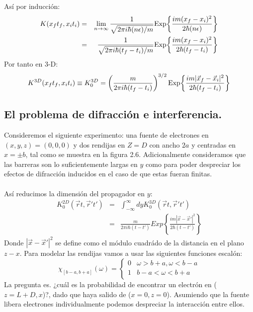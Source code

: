 Así por inducción:
\begin{eqnarray}
\nonumber K(x_{f}t_{f},x_{i}t_{i})&=&\lim_{n\to\infty}\frac{1}{\sqrt{2\pi i\hbar(n\epsilon)/m}}\text{Exp\ensuremath{\left\{ \frac{im(x_{f}-x_{i})^{2}}{2\hbar(n\epsilon)}\right\} }}\\
&=& \frac{1}{\sqrt{2\pi i\hbar(t_{f}-t_{i})/m}}\text{Exp\ensuremath{\left\{ \frac{im(x_{f}-x_{i})^{2}}{2\hbar(t_{f}-t_{i})}\right\} }}
\end{eqnarray}
Por tanto en 3-D:
\begin{equation}
K^{3D}(x_{f}t_{f},x_{i}t_{i})\equiv K_{0}^{3D}=\left(\frac{m}{2\pi i\hbar(t_{f}-t_{i})}\right)^{3/2}\text{Exp\ensuremath{\left\{ \frac{im|\vec{x}_{f}-\vec{x}_{i}|^{2}}{2\hbar(t_{f}-t_{i})}\right\} }}
\end{equation}


\subsection{El problema de difracción e interferencia.}
Consideremos el siguiente experimento: una fuente de electrones en $(x,y,z)=(0,0,0)$ y dos rendijas en $Z=D$ con ancho $2a$ y centradas en $x=\pm b$, tal como se muestra en la figura 2.6. Adicionalmente consideramos que las barreras son lo suficientemente largas en $y$ como para poder despreciar los efectos de difracción inducidos en el caso de que estas fueran finitas.\\
\\
Así reducimos la dimensión del propagador en $y$:
\begin{eqnarray}
\nonumber K_{0}^{2D}(\vec{r}t,\vec{r}\prime t\prime)&=&\int_{-\infty}^{\infty}dyK_{0}^{3D}(\vec{r}t,\vec{r}\prime t\prime)\\
&=& \frac{m}{2\pi i\hbar(t-t\prime)}Exp\left\{ \frac{im|\vec{x}-\vec{x}\prime|^{2}}{2\hbar(t-t\prime)}\right\} 
\end{eqnarray}
Donde $|\vec{x}-\vec{x}\prime|^{2}$ se define como el módulo cuadrádo de la distancia en el plano $z-x$. Para modelar las rendijas vamos a usar las siguientes funciones escalón:
\[   
\chi_{[b-a,b+a]}(\omega) = 
     \begin{cases}
       0 &\omega>b+a,\omega<b-a\\
       1 &b-a<\omega<b+a \\
      
     \end{cases}
\]
La pregunta es. ¿cuál es la probabilidad de encontrar un electrón en ($z=L+D,x$)?, dado que haya salido de ($x=0,z=0$). Asumiendo que la fuente libera electrones individualmente podemos despreciar la interacción entre ellos.
